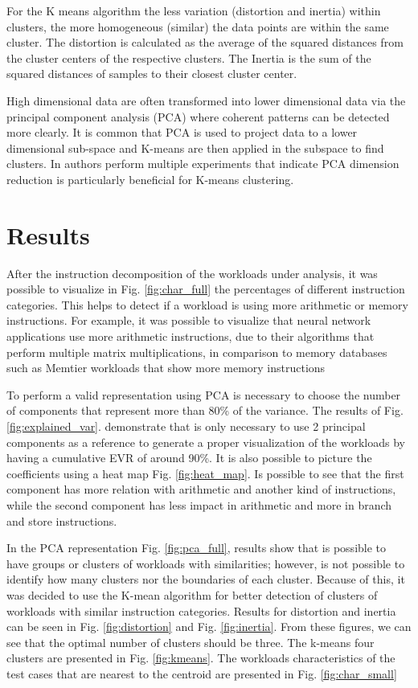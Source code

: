 \documentclass[]{PhDEngScITESO-R}
\begin{document}
For the K means algorithm the less variation (distortion and inertia) within clusters, the more homogeneous (similar) the data points are within the same cluster. The distortion is calculated as the average of the squared distances from the cluster centers of the respective clusters. The Inertia is the sum of the squared distances of samples to their closest cluster center.

High dimensional data are often transformed into lower dimensional data via the principal component analysis (PCA) where coherent patterns can be detected more clearly. It is common that PCA is used to project data to a lower dimensional sub-space and K-means \cite{Zhao} are then applied in the subspace to find clusters. In \cite{Ding} authors perform multiple experiments that indicate PCA dimension reduction is particularly beneficial for K-means clustering.

\section{Results}

After the instruction decomposition of the workloads under analysis, it was  possible to visualize in Fig. \ref{fig:char_full} the percentages of different instruction categories. This helps to detect if a workload is using more arithmetic or memory instructions. For example, it was possible to visualize that neural network applications use more arithmetic instructions, due to their algorithms that perform multiple matrix multiplications, in comparison to memory databases such as Memtier workloads that show more memory instructions

To perform a valid representation using PCA  is necessary to choose the number of components that represent more than 80\% of the variance. The results of Fig. \ref{fig:explained_var}. demonstrate that is only necessary to use 2 principal components as a reference to generate a proper visualization of the workloads by having a cumulative EVR of around 90\%. It is also possible to picture the coefficients using a heat map Fig. \ref{fig:heat_map}. Is possible to see that the first component has more relation with arithmetic and another kind of instructions, while the second component has less impact in arithmetic and more in branch and store instructions.

In the PCA representation Fig. \ref{fig:pca_full}, results show that is possible to have groups or clusters of workloads with similarities; however, is not possible to identify how many clusters nor the boundaries of each cluster. Because of this, it was decided to use the K-mean algorithm for better detection of clusters of workloads with similar instruction categories.  Results for distortion and inertia can be seen in Fig. \ref{fig:distortion} and Fig. \ref{fig:inertia}.  From these figures, we can see that the optimal number of clusters should be three. The k-means four clusters are presented in Fig. \ref{fig:kmeans}. The workloads characteristics of the test cases  that are nearest to the centroid are presented in Fig. \ref{fig:char_small}
\end{document}
